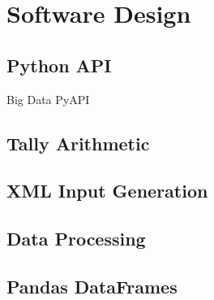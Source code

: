 \section{Software Design}
\label{sec:software}


\subsection{Python API}
\label{subsec:pyapi}

Big Data PyAPI\cite{boyd2016bigdata}


\subsection{Tally Arithmetic}
\label{subsec:tally-arithmetic}


\subsection{XML Input Generation}
\label{subsec:xml-inputs}

\subsection{Data Processing}
\label{subsec:xml-inputs}


\subsection{Pandas DataFrames}
\label{subsec:tally-arithmetic}
